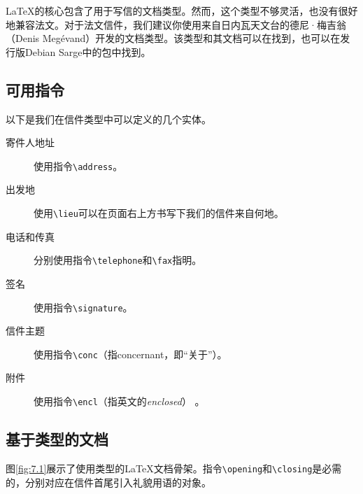 \LaTeX 的核心包含了用于写信的文档类型。然而，这个类型不够灵活，也没有很好地兼容\linebreak 法文。对于法文信件，我们建议你使用来自日内瓦天文台的德尼·梅吉翁（Denis Megévand）开发的文档类型。该类型和其文档可以在找到，也可以在发行版Debian Sarge中的包中找到。

\subsection{可用指令}

以下是我们在信件类型中可以定义的几个实体。

\begin{description}
    \item[寄件人地址] 使用指令\verb|\address|。
    \item[出发地] 使用\verb|\lieu|可以在页面右上方书写下我们的信件来自何地。
    \item[电话和传真] 分别使用指令\verb|\telephone|和\verb|\fax|指明。
    \item[签名] 使用指令\verb|\signature|。
    \item[信件主题] 使用指令\verb|\conc|（指concernant，即“关于”）。
    \item[附件] 使用指令\verb|\encl|（指英文的\emph{enclosed}） 。
\end{description}

\subsection{基于类型的文档}

图\ref{fig:7.1}展示了使用类型的\LaTeX 文档骨架。指令\verb|\opening|和\verb|\closing|是必需的，分别对应在信件首尾引入礼貌用语的对象。

